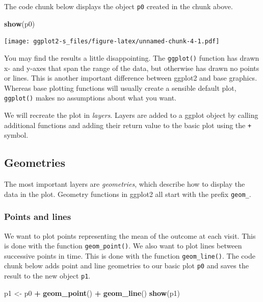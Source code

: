 \documentclass[
]{book}
\newenvironment{Shaded}{\begin{snugshade}}{\end{snugshade}}
\newcommand{\FunctionTok}[1]{\textcolor[rgb]{0.13,0.29,0.53}{\textbf{#1}}}
\newcommand{\NormalTok}[1]{#1}
\newcommand{\OtherTok}[1]{\textcolor[rgb]{0.56,0.35,0.01}{#1}}
\newcommand{\SpecialCharTok}[1]{\textcolor[rgb]{0.81,0.36,0.00}{\textbf{#1}}}
\begin{document}
The code chunk below displays the object \texttt{p0} created in the chunk above.

\begin{Shaded}
\begin{Highlighting}[]
\FunctionTok{show}\NormalTok{(p0)}
\end{Highlighting}
\end{Shaded}

\texttt{[image: ggplot2-s\_files/figure-latex/unnamed-chunk-4-1.pdf]}

You may find the results a little disappointing. The \texttt{ggplot()} function has drawn x- and y-axes that span the range of the data, but otherwise has drawn no points or lines. This is another important difference between ggplot2 and base graphics. Whereas base plotting functions will usually create a sensible default plot, \texttt{ggplot()} makes no assumptions about what you want.

We will recreate the plot in \emph{layers}. Layers are added to a ggplot object by calling additional functions and adding their return value to the basic plot using the \texttt{+} symbol.

\subsection{Geometries}\label{geometries}

The most important layers are \emph{geometries}, which describe how to display the data in the plot. Geometry functions in ggplot2 all start with the prefix \texttt{geom\_}.

\subsubsection{Points and lines}\label{points-and-lines}

We want to plot points representing the mean of the outcome at each visit. This is done with the function \texttt{geom\_point()}. We also want to plot lines between successive points in time. This is done with the function \texttt{geom\_line()}. The code chunk below adds point and line geometries to our basic plot \texttt{p0} and saves the result to the new object \texttt{p1}.

\begin{Shaded}
\begin{Highlighting}[]
\NormalTok{p1 }\OtherTok{\textless{}{-}}\NormalTok{ p0 }\SpecialCharTok{+} \FunctionTok{geom\_point}\NormalTok{() }\SpecialCharTok{+} \FunctionTok{geom\_line}\NormalTok{()}
\FunctionTok{show}\NormalTok{(p1)}
\end{Highlighting}
\end{Shaded}
\end{document}
